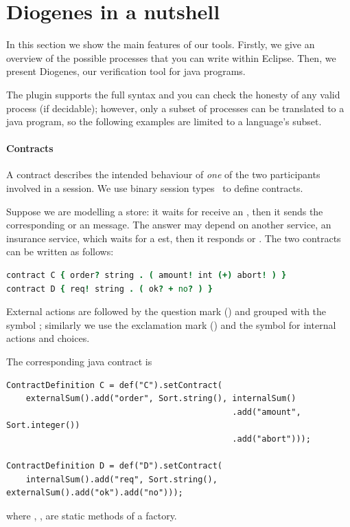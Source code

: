 \section{Diogenes in a nutshell}

In this section we show the main features of our tools.
%
Firstly, we give an overview of the possible \coco processes
that you can write within Eclipse. 
Then, we present Diogenes, our verification tool for java programs.

The plugin supports the full \coco syntax and you can check
the honesty of any valid process (if decidable); however,
only a subset of processes can be translated to a java program, 
so the following examples are limited to a language's subset.

\paragraph{Contracts}
A contract describes the intended behaviour of \emph{one} of the two
participants involved in a session.  We use binary session
types~\cite{Honda98esop} to define contracts. 

Suppose we are modelling a store: it waits for receive
an , then it sends the corresponding  or an  message.
The answer may depend on another service, \ie an insurance service,
which waits for a est, then it responds  or .
%
The two contracts can be written as follows:
%
\begin{lstlisting}[language=coco,basicstyle=\scriptsize\ttfamily]
contract C { order? string . ( amount! int (+) abort! ) }
contract D { req! string . ( ok? + no? ) }
\end{lstlisting}
External actions are followed by the question mark () and grouped
with the symbol \code{+}; similarly we use the
exclamation mark (\code{!}) and the symbol \code{(+)} for
internal actions and choices.

The corresponding java contract is
\begin{mdframed}
\begin{verbatim}
ContractDefinition C = def("C").setContract(
    externalSum().add("order", Sort.string(), internalSum()
                                              .add("amount", Sort.integer())
                                              .add("abort")));
        
ContractDefinition D = def("D").setContract(
    internalSum().add("req", Sort.string(), externalSum().add("ok").add("no")));
\end{verbatim}
\end{mdframed}
where , ,  
are static methods of a factory.


